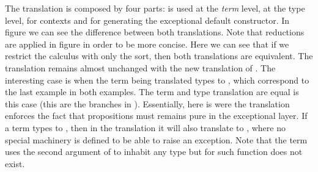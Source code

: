 The translation is composed by four parts: \WTrans{\cdot} is used at the \emph{term} level, 
\WTypeTrans{\cdot} at the type level, \WContextTrans{\cdot} for contexts and \WTransErr{\cdot} for 
generating the exceptional default constructor. In figure 
we can see the difference between both translations.
Note that reductions are applied in figure in order to be more concise.
Here we can see that if we restrict the calculus with only the \Type[]{} sort, then both translations
are equivalent. The translation remains almost unchanged with the new translation of \Prop{}. The interesting 
case is when the term being translated types to \Prop{}, which correspond to the last example in both examples.
The term and type translation are equal is this case (this are the branches in 
). Essentially, here is were the translation enforces the fact that 
propositions must remains pure in the exceptional layer. If a term types to \Prop{}, 
then in the translation 
it will also translate to \Prop{}, where no special machinery is defined to be able to raise an exception. 
Note that the \raiseFun{} term uses the second argument of \TypeVal{} to inhabit any type but for \Prop{}
such function does not exist.

